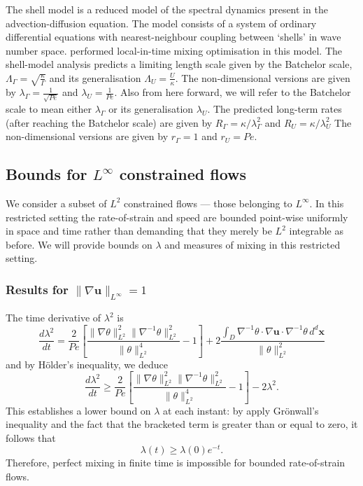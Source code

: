 \documentclass[12pt]{iopart}
\newcommand{\ddt}[1]{\frac{d #1}{dt}}
\newcommand{\hmone}[1]{\|\nabla^{-1} #1\|_{L^{2}}}
\newcommand{\ltwo}[1]{\|#1\|_{L^{2}}}
\newcommand{\hone}[1]{\| \nabla #1\|_{L^{2}}}
\newcommand{\sint}[1]{\int_{D} #1 \, d^{d}\mathbf{x}}
\renewcommand{\vec}[1]{\mathbf{#1}}
\newcommand{\linf}[1]{\| #1 \|_{L^{\infty}}}
\begin{document}
The shell model is a reduced model of the spectral dynamics present in the advection-diffusion equation. The model consists of a system of ordinary differential equations with nearest-neighbour coupling between `shells' in wave number space. \cite{Miles2017a} performed local-in-time mixing optimisation in this model. The shell-model analysis predicts a limiting length scale given by the Batchelor scale, $\Lambda_{\Gamma} =\sqrt{\frac{\kappa}{\Gamma}}$  and its generalisation $\Lambda_{U}= \frac{U}{\kappa} $. The non-dimensional versions are given by $\lambda_{\Gamma}= \frac{1}{\sqrt{Pe}}$ and $\lambda_{U} = \frac{1}{Pe}$.  Also from here forward, we will refer to the Batchelor scale to mean either $\lambda_{\Gamma}$ or its generalisation $\lambda_{U}$.  The predicted long-term rates (after reaching the Batchelor scale) are given by $R_{\Gamma} =\kappa/\lambda_{\Gamma}^2 $  and  $R_{U}=\kappa/\lambda_{U}^2$  The non-dimensional versions are given by $r_{\Gamma} =1$ and $r_{U} = Pe $.

\subsection{Bounds for $L^{\infty}$ constrained flows}
We consider a subset of $L^{2}$ constrained flows --- those belonging to $L^{\infty}$. In this restricted setting the rate-of-strain and speed are bounded point-wise uniformly in space and time rather than demanding that they merely be $L^2$ integrable as before. We will provide bounds on $\lambda$ and measures of mixing in this restricted setting. 

\label{sec:linfty_flows}
\subsubsection{Results for $\linf{\nabla \vec{u}} = 1$}

The time derivative of $\lambda^2$ is
%
\begin{equation}
	\ddt{\lambda^2} = \frac{2}{Pe}
		\left[ 
			\frac{\hone{\theta}^2\hmone{\theta}^2}
					{\ltwo{\theta}^4}  
			- 1
		\right]
		+ 2 \frac{\sint{\nabla^{-1}\theta \cdot \nabla\vec{u} \cdot 
							\nabla^{-1}\theta  }}
					  {\ltwo{\theta}^{2}}
\end{equation}
and by H\"older's inequality, we deduce
\begin{equation}
\label{eq:length_ineq_rate-of-strain}
	\ddt{\lambda^2} \geq \frac{2}{Pe} \left[ 
			\frac{\hone{\theta}^2\hmone{\theta}^2}
					{\ltwo{\theta}^4}  
			- 1
		\right] - 2  \lambda^2 .
\end{equation}
This establishes a lower bound on $\lambda$ at each instant: by apply Gr\"onwall's inequality and the fact that the bracketed term is greater than or equal to zero, it follows that
%
\begin{equation}
\label{eq:exponential_enstrophy}
	\lambda (t) \geq \lambda(0)e^{- t}.
\end{equation}
%
Therefore, perfect mixing in finite time is impossible for bounded rate-of-strain flows.
\end{document}
